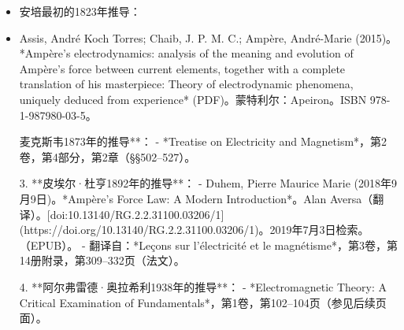 \begin{itemize}
\item 安培最初的1823年推导：
\item Assis, André Koch Torres; Chaib, J. P. M. C.; Ampère, André-Marie (2015)。*Ampère's electrodynamics: analysis of the meaning and evolution of Ampère's force between current elements, together with a complete translation of his masterpiece: Theory of electrodynamic phenomena, uniquely deduced from experience* (PDF)。蒙特利尔：Apeiron。ISBN 978-1-987980-03-5。

麦克斯韦1873年的推导**：
   - *Treatise on Electricity and Magnetism*，第2卷，第4部分，第2章（§§502–527）。

3. **皮埃尔·杜亨1892年的推导**：
   - Duhem, Pierre Maurice Marie (2018年9月9日)。*Ampère's Force Law: A Modern Introduction*。Alan Aversa（翻译）。[doi:10.13140/RG.2.2.31100.03206/1](https://doi.org/10.13140/RG.2.2.31100.03206/1)。2019年7月3日检索。（EPUB）。
   - 翻译自：*Leçons sur l’électricité et le magnétisme*，第3卷，第14册附录，第309–332页（法文）。

4. **阿尔弗雷德·奥拉希利1938年的推导**：
   - *Electromagnetic Theory: A Critical Examination of Fundamentals*，第1卷，第102–104页（参见后续页面）。
\end{itemize}